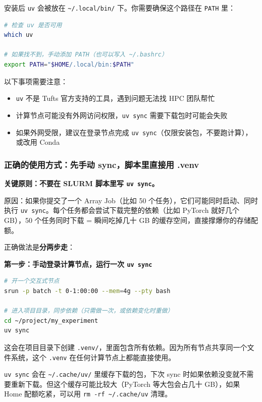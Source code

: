 安装后 \texttt{uv} 会被放在 \texttt{\textasciitilde/.local/bin/} 下。你需要确保这个路径在 \texttt{PATH} 里：

\begin{lstlisting}[language=bash]
# 检查 uv 是否可用
which uv

# 如果找不到，手动添加 PATH（也可以写入 ~/.bashrc）
export PATH="$HOME/.local/bin:$PATH"
\end{lstlisting}

\begin{warnbox}
以下事项需要注意：
\begin{itemize}[nosep]
  \item \texttt{uv} 不是 Tufts 官方支持的工具，遇到问题无法找 HPC 团队帮忙
  \item 计算节点可能没有外网访问权限，\texttt{uv sync} 需要下载包时可能会失败
  \item 如果外网受限，建议在登录节点完成 \texttt{uv sync}（仅限安装包，不要跑计算），或改用 Conda
\end{itemize}
\end{warnbox}

\subsubsection{正确的使用方式：先手动 sync，脚本里直接用 .venv}

\textbf{关键原则：不要在 SLURM 脚本里写 \texttt{uv sync}。}

原因：如果你提交了一个 Array Job（比如 50 个任务），它们可能同时启动、同时执行 \texttt{uv sync}。每个任务都会尝试下载完整的依赖（比如 PyTorch 就好几个 GB），50 个任务同时下载 = 瞬间吃掉几十 GB 的缓存空间，直接撑爆你的存储配额。

正确做法是\textbf{分两步走}：

\textbf{第一步：手动登录计算节点，运行一次 \texttt{uv sync}}

\begin{lstlisting}[language=bash]
# 开一个交互式节点
srun -p batch -t 0-1:00:00 --mem=4g --pty bash

# 进入项目目录，同步依赖（只需做一次，或依赖变化时重做）
cd ~/project/my_experiment
uv sync
\end{lstlisting}

这会在项目目录下创建 \texttt{.venv/}，里面包含所有依赖。因为所有节点共享同一个文件系统，这个 \texttt{.venv} 在任何计算节点上都能直接使用。

\texttt{uv sync} 会在 \texttt{\textasciitilde/.cache/uv/} 里缓存下载的包，下次 sync 时如果依赖没变就不需要重新下载。但这个缓存可能比较大（PyTorch 等大包会占几十 GB），如果 Home 配额吃紧，可以用 \texttt{rm -rf \textasciitilde/.cache/uv} 清理。

